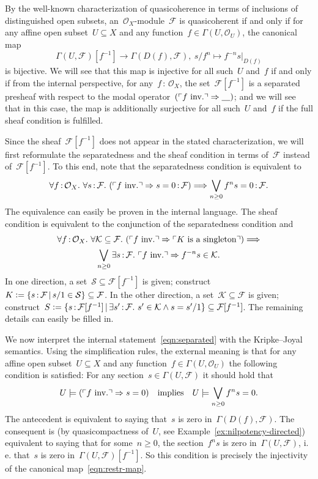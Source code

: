 \documentclass[10pt,reqno,a4paper]{amsbook}
\makeatletter
\theoremstyle{definition}
\theoremstyle{plain}
\theoremstyle{remark}
\newcommand{\F}{\mathcal{F}}
\renewcommand{\O}{\mathcal{O}}
\newcommand{\K}{\mathcal{K}}
\renewcommand{\S}{\mathcal{S}}
\newcommand{\placeholder}{\underline{\quad}}
\newcommand{\?}{\,{:}\,}
\renewcommand{\_}{\mathpunct{.}\,}
\newcommand{\speak}[1]{\ulcorner\text{\textnormal{#1}}\urcorner}
\newcommand{\lra}{\longrightarrow}
\newcommand{\ie}{i.\,e.\@\xspace}
\newcommand{\inv}{inv.\@}
\newcommand{\defeq}{\vcentcolon=}
\renewenvironment{proof}[1][\proofname]{\par
  \pushQED{\qed}%
  \normalfont \topsep6\p@\@plus6\p@\relax
  \trivlist
  \item[\hskip\labelsep
        \itshape
    #1\@addpunct{.}]\ignorespaces
}{%
  \popQED\endtrivlist\@endpefalse
}
\makeatother
\begin{document}
\begin{proof}[Proof of Theorem~\ref{thm:qcoh-sheafchar}]
By the well-known characterization of quasicoherence in terms of inclusions of
distinguished open subsets, an~$\O_X$-module~$\F$ is quasicoherent if and only
if for any affine open subset~$U \subseteq X$ and any function~$f \in
\Gamma(U,\O_U)$, the canonical map
\begin{equation}\label{eqn:restr-map}
  \Gamma(U,\F)[f^{-1}] \lra \Gamma(D(f),\F), \ s/f^n \longmapsto
  f^{-n} s|_{D(f)}
\end{equation}
is bijective. We will see that this map is injective for all such~$U$ and~$f$
if and only if from the internal perspective, for any~$f\?\O_X$, the set~$\F[f^{-1}]$ is a
separated presheaf with respect to the modal operator~$(\speak{$f$ \inv}
\Rightarrow \placeholder)$; and we will see that in this
case, the map is additionally surjective for all such~$U$ and~$f$ if the full
sheaf condition is fulfilled.

Since the sheaf~$\F[f^{-1}]$ does not appear in the stated characterization, we
will first reformulate the separatedness and the sheaf condition in terms
of~$\F$ instead of~$\F[f^{-1}]$. To this end, note that the separatedness
condition is equivalent to
\begin{equation}\label{eqn:separated}
  \forall f\?\O_X\_ \forall s\?\F\_
  (\speak{$f$ \inv} \Rightarrow s = 0 \? \F) \Longrightarrow
  \bigvee_{n \geq 0} f^n s = 0 \? \F.
\end{equation}
The equivalence can easily be proven in the internal language. The sheaf
condition is equivalent to the conjunction of the separatedness condition and
\begin{multline}\label{eqn:sheaf}
  \forall f\?\O_X\_ \forall \K \subseteq \F\_
  (\speak{$f$ \inv} \Rightarrow \speak{$K$ is a singleton})
  \Longrightarrow \\
  \bigvee_{n \geq 0} \exists s\?\F\_
  \speak{$f$ \inv} \Rightarrow f^{-n} s \in \K.
\end{multline}
In one direction, a set~$\S \subseteq \F[f^{-1}]$ is given; construct~$K \defeq \{
s\?\F \,|\, s/1 \in \S \} \subseteq \F$. In the other direction, a set~$\K
\subseteq \F$ is given; construct~$S \defeq \{ s\?\F[f^{-1}] \,|\, \exists
s'\?\F\_ s' \in \K \wedge s = s'/1 \} \subseteq \F[f^{-1}]$. The remaining
details can easily be filled in.

We now interpret the internal statement~\eqref{eqn:separated} with the
Kripke--Joyal semantics. Using the simplification rules, the external meaning
is that for any affine open subset~$U \subseteq X$ and any function~$f \in
\Gamma(U,\O_U)$ the following condition is satisfied: For any section~$s \in
\Gamma(U,\F)$ it should hold that
\[ U \models (\speak{$f$ \inv} \Rightarrow s = 0) \quad\text{implies}\quad
  U \models \bigvee_{n \geq 0} f^n s = 0. \]
The antecedent is equivalent to saying that~$s$ is zero in~$\Gamma(D(f),\F)$.
The consequent is (by quasicompactness of~$U$, see
Example~\ref{ex:nilpotency-directed}) equivalent to saying that for some~$n \geq 0$, the
section~$f^n s$ is zero in~$\Gamma(U,\F)$, \ie that~$s$ is zero
in~$\Gamma(U,\F)[f^{-1}]$. So this condition is precisely the injectivity of
the canonical map~\eqref{eqn:restr-map}.


\end{proof}
\end{document}
